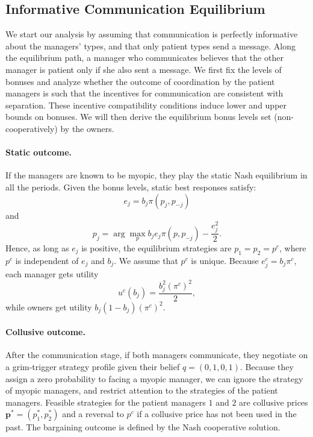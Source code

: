 \documentclass[]{article}
\newcommand{\p}{\mathbf p}
\begin{document}
\subsection{Informative Communication Equilibrium}\label{sec:sep_eq}
We start our analysis by assuming that communication is perfectly informative about the managers' types, and that only patient types send a message. Along the equilibrium path, a manager who communicates believes that the other manager is patient only if she also sent a message. We first fix the levels of bonuses and analyze whether the outcome of coordination by the patient managers is such that the incentives for communication are consistent with separation. These incentive compatibility conditions induce lower and upper bounds on bonuses. We will then derive the equilibrium bonus levels set (non-cooperatively) by the owners.%

\paragraph{Static outcome.} If the managers are known to be myopic, they play the static Nash equilibrium in all the periods. Given the bonus levels, static best responses satisfy:
\begin{equation}
e_j=b_j \pi(p_j,p_{-j})
\end{equation}
and
\begin{equation}
p_j=\arg\max_p b_j e_j \pi(p,p_{-j})-\frac{e_j^2}{2}.
\end{equation}
%
Hence, as long as $e_j$ is positive, the equilibrium strategies are $p_1=p_2=p^c$, where $p^c$ is independent of $e_j$ and $b_j$. We assume that $p^c$ is unique. Because $e_j^c=b_j\pi^c$, each manager gets utility \[u^c(b_j)=\frac{b_j^2 (\pi^c)^2}{2},\] while owners get utility $b_j(1-b_j)(\pi^c)^2$.

\paragraph{Collusive outcome.} After the communication stage, if both managers communicate, they negotiate on a grim-trigger strategy profile given their belief $q=(0,1,0,1)$. Because they assign a zero probability to facing a myopic manager, we can ignore the strategy of myopic managers, and restrict attention to the strategies of the patient managers. Feasible strategies for the patient managers $1$ and $2$ are collusive prices $\p^*=(p^*_1,p^*_2)$ and a reversal to $p^c$ if a collusive price has not been used in the past. The bargaining outcome is defined by the Nash cooperative solution. 
\end{document}
